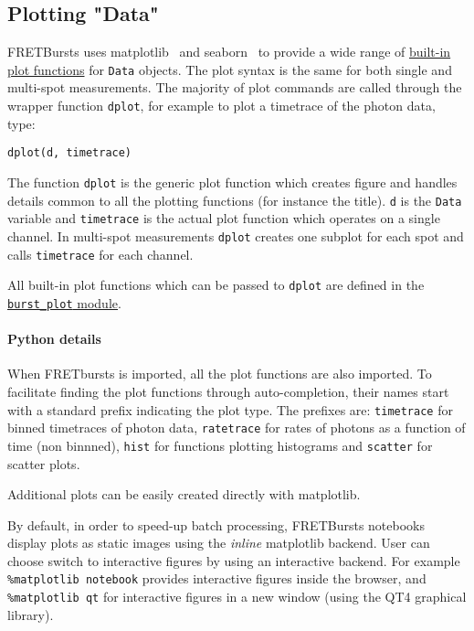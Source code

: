 \subsection{Plotting "Data"}
\label{sec:plotting}

FRETBursts uses 
matplotlib~\cite{matplotlib}
and seaborn~\cite{seaborn} 
to provide a wide range of
\href{http://fretbursts.readthedocs.org/en/latest/plots.html}{built-in plot functions}
for \verb|Data| objects.
The plot syntax is the same for both single and multi-spot measurements.
The majority of plot commands are called through the wrapper function
\verb|dplot|, for example to plot a timetrace of the photon data, type:

\begin{lstlisting}
dplot(d, timetrace)
\end{lstlisting}

The function \verb|dplot| is the generic plot function which creates figure
and handles details common to all the plotting functions (for instance the title).
\verb|d| is the \verb|Data| variable and \verb|timetrace| is the actual plot
function which operates on a single channel. In multi-spot measurements
\verb|dplot| creates one subplot for each spot and calls \verb|timetrace| for
each channel.

All built-in plot functions which can be passed to
\verb|dplot| are defined in the
\href{http://fretbursts.readthedocs.org/en/latest/plots.html}{\texttt{burst\_plot} module}.

\paragraph{Python details}

When FRETbursts is imported, all the plot functions are also imported.
To facilitate finding the plot functions through auto-completion,
their names start with a standard prefix indicating the
plot type. The prefixes are: \verb|timetrace| for binned timetraces
of photon data, \verb|ratetrace| for rates of photons as a function of time (non
binnned), \verb|hist| for functions plotting histograms and \verb|scatter| for
scatter plots.

Additional plots can be easily created directly with matplotlib.

By default, in order to speed-up batch processing, FRETBursts notebooks display plots 
as static images using the \textit{inline} matplotlib backend. 
User can choose switch to interactive figures by using an interactive backend. 
For example \verb|%matplotlib notebook| 
provides interactive figures inside the browser, 
and \verb|%matplotlib qt| 
for interactive figures in a new window (using the QT4 graphical library).

